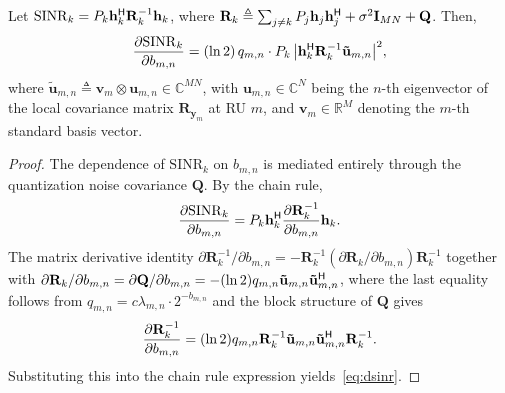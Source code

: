 \documentclass[10pt,a4paper]{amsart}
\begin{document}
\begin{lemma}
\label{lem:dsinr}
Let $\mathrm{SINR}_k = P_k \mathbf{h}_k^{\sf H} 
\mathbf{R}_k^{-1} \mathbf{h}_k$, where $\mathbf{R}_k \triangleq \sum_{j \neq k} P_j \mathbf{h}_j \mathbf{h}_j^{\sf H} + \sigma^2 \mathbf{I}_{MN} + \mathbf{Q}$. 
Then,
\begin{align} \label{eq:dsinr}
  \frac{\partial \mathrm{SINR}_k}{\partial b_{m,n}} 
  = (\ln 2) \, q_{m,n} \cdot P_k \, 
    \big|\mathbf{h}_k^{\sf H} \mathbf{R}_k^{-1} 
         \mathbf{\tilde u}_{m,n}\big|^2,
\end{align}
where $\mathbf{\tilde u}_{m,n} \triangleq \mathbf{v}_m \otimes \mathbf{u}_{m,n} \in \mathbb{C}^{MN}$, with $\mathbf{u}_{m,n} \in \mathbb{C}^N$ being the $n$-th eigenvector of the local covariance matrix $\mathbf{R}_{\mathbf{y}_m}$ at RU $m$, and $\mathbf{v}_m \in \mathbb{R}^M$ denoting the $m$-th standard basis vector.
\end{lemma}

\begin{proof}
The dependence of $\mathrm{SINR}_k$ on $b_{m,n}$ is 
mediated entirely through the quantization noise 
covariance $\mathbf{Q}$. By the chain rule,
\begin{align}
  \frac{\partial \mathrm{SINR}_k}{\partial b_{m,n}} 
  = P_k \mathbf{h}_k^{\sf H} 
    \frac{\partial \mathbf{R}_k^{-1}}
         {\partial b_{m,n}} \mathbf{h}_k.
\end{align}
The matrix derivative identity 
$\partial \mathbf{R}_k^{-1}/\partial b_{m,n} 
= -\mathbf{R}_k^{-1} (\partial \mathbf{R}_k/
\partial b_{m,n}) \mathbf{R}_k^{-1}$ together with 
$\partial \mathbf{R}_k/\partial b_{m,n} 
= \partial \mathbf{Q}/\partial b_{m,n} 
= -(\ln 2) q_{m,n} \mathbf{\tilde u}_{m,n} \mathbf{\tilde u}_{m,n}^{\sf H}$, where the last equality follows from $q_{m,n} = c \lambda_{m,n} \cdot 2^{-b_{m,n}}$ and the block structure of $\mathbf{Q}$ gives
\begin{align}
  \frac{\partial \mathbf{R}_k^{-1}}{\partial b_{m,n}} 
  = (\ln 2) q_{m,n} \mathbf{R}_k^{-1} 
    \mathbf{\tilde u}_{m,n} \mathbf{\tilde u}_{m,n}^{\sf H} 
    \mathbf{R}_k^{-1}.
\end{align}
Substituting this into the chain rule expression 
yields~\eqref{eq:dsinr}.
\end{proof}
\end{document}
